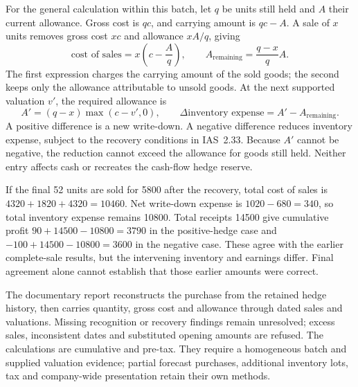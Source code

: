 For the general calculation within this batch, let $q $ be units still held and
$A$ their current allowance. Gross cost is $qc $, and carrying amount is $qc-A$.
A sale of $x $ units removes gross cost $xc $ and allowance $xA/q $, giving
\[
 \text{cost of sales}=x\left(c-\frac{A}{q}\right),
 \qquad A_{\mathrm{remaining}}=\frac{q-x}{q}A.
\]
The first expression charges the carrying amount of the sold goods; the
second keeps only the allowance attributable to unsold goods. At the next
supported valuation $v'$, the required allowance is
\[
 A'=(q-x)\max(c-v',0),\qquad
 \Delta\text{inventory expense}=A'-A_{\mathrm{remaining}}.
\]
A positive difference is a new write-down. A negative difference reduces
inventory expense, subject to the recovery conditions in IAS~2.33. Because
$A'$ cannot be negative, the reduction cannot exceed the allowance for goods
still held. Neither entry affects cash or recreates the cash-flow hedge reserve.

If the final 52 units are sold for 5800 after the recovery, total cost of sales
is $4320+1820+4320=10460$. Net write-down expense is $1020-680=340$, so total
inventory expense remains 10800. Total receipts 14500 give cumulative profit
$90+14500-10800=3790$ in the positive-hedge case and
$-100+14500-10800=3600$ in the negative case. These agree with the earlier
complete-sale results, but the intervening inventory and earnings differ.
Final agreement alone cannot establish that those earlier amounts were correct.

The documentary  report reconstructs the
purchase from the retained hedge history, then carries quantity, gross cost
and allowance through dated sales and valuations. Missing recognition or
recovery findings remain unresolved; excess sales, inconsistent dates and
substituted opening amounts are refused. The calculations are cumulative and
pre-tax. They require a homogeneous batch and supplied valuation evidence;
partial forecast purchases, additional inventory lots, tax and company-wide
presentation retain their own methods.\citep{EU2023IAS}
